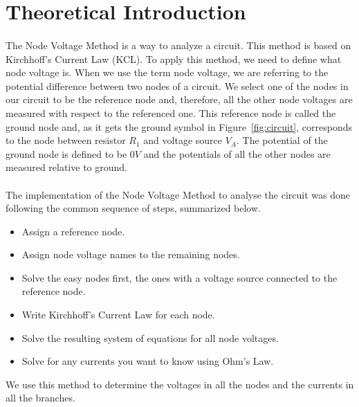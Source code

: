 \section{Theoretical Introduction}
\label{sec:theoretical}


\paragraph{}
The Node Voltage Method is a way to analyze a circuit. This method is based on Kirchhoff's Current Law (KCL). To apply this method, we need to define what node voltage is. When we use the term node voltage, we are referring to the potential difference between two nodes of a circuit. We select one of the nodes in our circuit to be the reference node and, therefore, all the other node voltages are measured with respect to the referenced one. This reference node is called the ground node and, as it gets the ground symbol in Figure~\ref{fig:circuit}, corresponds to the node between resistor $R_1$ and voltage source $V_A$. The potential of the ground node is defined to be $0 V$ and the potentials of all the other nodes are measured relative to ground.

\paragraph{}
The implementation of the Node Voltage Method to analyse the circuit was done following the common sequence of steps, summarized below.
\begin{itemize}
    \item Assign a reference node.
    \item Assign node voltage names to the remaining nodes.
    \item Solve the easy nodes first, the ones with a voltage source connected to the reference node.
    \item Write Kirchhoff's Current Law for each node.
    \item Solve the resulting system of equations for all node voltages.
    \item Solve for any currents you want to know using Ohm's Law.
\end{itemize}

\vspace{0.1cm}

We use this method to determine the voltages in all the nodes and the currents in all the branches.

